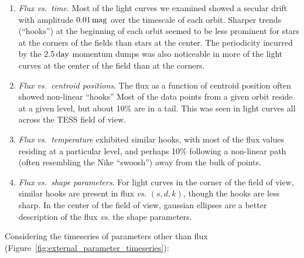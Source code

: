 \documentclass[12pt,twocolumn,tighten]{aastex62}
\begin{document}
\begin{enumerate}

\item {\it Flux vs.\ time}. Most of the light curves we examined showed a secular
    drift with amplitude $0.01\,{\rm mag}$ over the timescale of each
    orbit.  Sharper trends (``hooks'') at the beginning of each orbit
    seemed to be less prominent for stars at the corners of the fields
    than stars at the center.  The periodicity incurred by the
    2.5$\,{\rm day}$ momentum dumps was also noticeable in more of the
    light curves at the center of the field than at the corners.

\item {\it Flux vs.\ centroid positions}. The flux as a function of
  centroid position often showed non-linear ``hooks''
    Most of the data points from a given orbit reside at a given
    level, but about 10\% are in a tail. This was seen in light curves
    all across the TESS field of view.

\item {\it Flux vs.\ temperature} exhibited similar hooks, with most of
  the flux values residing at a particular level, and perhaps 10\%
    following a non-linear path (often resembling the Nike ``swoosh'')
    away from the bulk of points.

\item {\it Flux vs.\ shape parameters}.  For light curves in the corner
  of the field of view, similar hooks are present in flux {\it vs.}
    $(s,d,k)$, though the hooks are less sharp.  In the center of the
    field of view, gaussian ellipses are a better description of the
    flux {\it vs.} the shape parameters.
    
\end{enumerate}

Considering the timeseries of parameters other than flux 
(Figure~\ref{fig:external_parameter_timeseries}):
\end{document}
